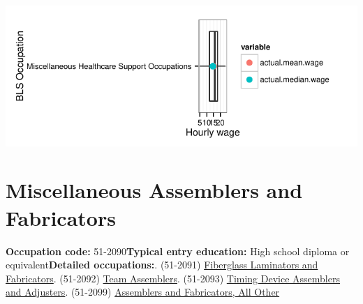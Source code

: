 \documentclass[a4paper,10pt]{article}\usepackage[]{graphicx}\usepackage[]{color}
\makeatletter
\def\maxwidth{ %
  \ifdim\Gin@nat@width>\linewidth
    \linewidth
  \else
    \Gin@nat@width
  \fi
}
\makeatother
\begin{document}
{\centering \includegraphics[width=\maxwidth]{figure/unnamed-chunk-222} 

}


\newpage\section{Miscellaneous Assemblers and Fabricators}\textbf{Occupation code:} 51-2090\newline\textbf{Typical entry education:} High school diploma or equivalent\newline\textbf{Detailed occupations:}. (51-2091)  \href{http://www.bls.gov/oes/current/oes512091.htm}{Fiberglass Laminators and Fabricators}. (51-2092)  \href{http://www.bls.gov/oes/current/oes512092.htm}{Team Assemblers}. (51-2093)  \href{http://www.bls.gov/oes/current/oes512093.htm}{Timing Device Assemblers and Adjusters}. (51-2099)  \href{http://www.bls.gov/oes/current/oes512099.htm}{Assemblers and Fabricators, All Other}\newline%
\end{document}
